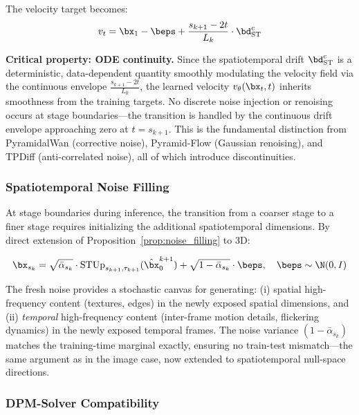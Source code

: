 The velocity target becomes:
\begin{equation}
    v_t = \bx_1 - \beps + \frac{s_{k+1} - 2t}{L_k} \cdot \bd^c_{\text{ST}}
    \label{eq:video_velocity}
\end{equation}

\textbf{Critical property: ODE continuity.}
Since the spatiotemporal drift $\bd^c_{\text{ST}}$ is a deterministic, data-dependent quantity smoothly modulating the velocity field via the continuous envelope $\frac{s_{k+1}-2t}{L_k}$, the learned velocity $v_\theta(\bx_t, t)$ inherits smoothness from the training targets.
No discrete noise injection or renoising occurs at stage boundaries---the transition is handled by the continuous drift envelope approaching zero at $t = s_{k+1}$.
This is the fundamental distinction from PyramidalWan (corrective noise), Pyramid-Flow (Gaussian renoising), and TPDiff (anti-correlated noise), all of which introduce discontinuities.

\subsubsection{Spatiotemporal Noise Filling}

At stage boundaries during inference, the transition from a coarser stage to a finer stage requires initializing the additional spatiotemporal dimensions.
By direct extension of Proposition~\ref{prop:noise_filling} to 3D:

\begin{equation}
    \bx_{s_k} = \sqrt{\bar\alpha_{s_k}} \cdot \text{STUp}_{s_{k+1},\tau_{k+1}}(\hat\bx_0^{k+1}) + \sqrt{1 - \bar\alpha_{s_k}} \cdot \beps, \quad \beps \sim \N(0, I)
    \label{eq:st_noise_fill}
\end{equation}

The fresh noise provides a stochastic canvas for generating: (i) spatial high-frequency content (textures, edges) in the newly exposed spatial dimensions, and (ii) \emph{temporal} high-frequency content (inter-frame motion details, flickering dynamics) in the newly exposed temporal frames.
The noise variance $(1 - \bar\alpha_{s_k})$ matches the training-time marginal exactly, ensuring no train-test mismatch---the same argument as in the image case, now extended to spatiotemporal null-space directions.

\subsubsection{DPM-Solver Compatibility}

